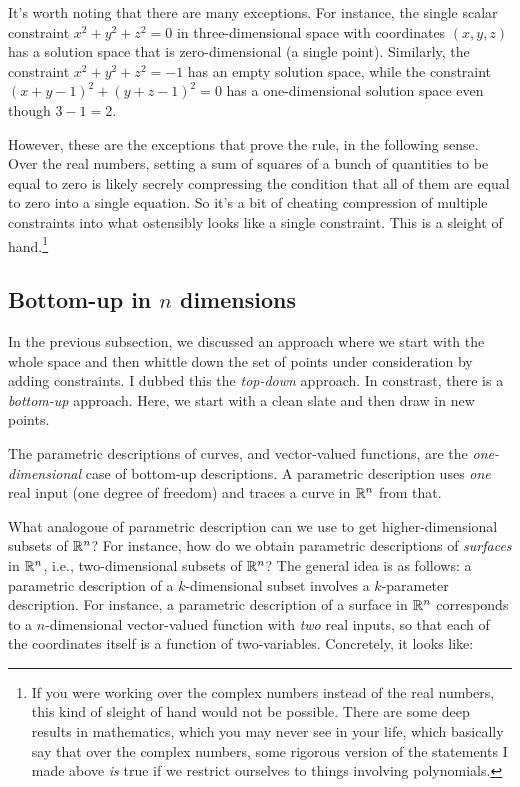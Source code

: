 \documentclass[10pt]{amsart}
\begin{document}
It's worth noting that there are many exceptions. For instance, the
single scalar constraint $x^2 + y^2 + z^2 = 0$ in three-dimensional
space with coordinates $(x,y,z)$ has a solution space that is
zero-dimensional (a single point). Similarly, the constraint $x^2 +
y^2 + z^2 = -1$ has an empty solution space, while the constraint $(x
+ y - 1)^2 + (y + z - 1)^2 = 0$ has a one-dimensional solution space
even though $3 - 1 = 2$.

However, these are the exceptions that prove the rule, in the
following sense. Over the real numbers, setting a sum of squares of a
bunch of quantities to be equal to zero is likely secrely compressing
the condition that all of them are equal to zero into a single
equation. So it's a bit of cheating compression of multiple
constraints into what ostensibly looks like a single constraint. This
is a sleight of hand.\footnote{If you were working over the complex
numbers instead of the real numbers, this kind of sleight of hand
would not be possible. There are some deep results in mathematics,
which you may never see in your life, which basically say that over
the complex numbers, some rigorous version of the statements I made
above {\em is} true if we restrict ourselves to things involving
polynomials.}

\subsection{Bottom-up in $n$ dimensions}

In the previous subsection, we discussed an approach where we start
with the whole space and then whittle down the set of points under
consideration by adding constraints. I dubbed this the {\em top-down}
approach. In constrast, there is a {\em bottom-up} approach. Here, we
start with a clean slate and then draw in new points.

The parametric descriptions of curves, and vector-valued functions,
are the {\em one-dimensional} case of bottom-up descriptions. A
parametric description uses {\em one} real input (one degree of
freedom) and traces a curve in $\mathbb{R}^n$ from that.

What analogoue of parametric description can we use to get
higher-dimensional subsets of $\mathbb{R}^n$? For instance, how do we obtain
parametric descriptions of {\em surfaces} in $\mathbb{R}^n$, i.e.,
two-dimensional subsets of $\mathbb{R}^n$? The general idea is as follows: a
parametric description of a $k$-dimensional subset involves a
$k$-parameter description. For instance, a parametric description of a
surface in $\mathbb{R}^n$ corresponds to a $n$-dimensional vector-valued
function with {\em two} real inputs, so that each of the coordinates
itself is a function of two-variables. Concretely, it looks like:
\end{document}
